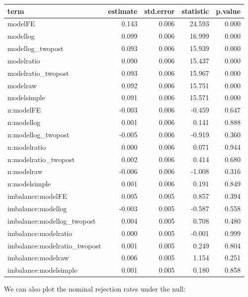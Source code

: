 \documentclass[
]{book}
\begin{document}
\begin{tabular}{l|r|r|r|r}
\hline
term & estimate & std.error & statistic & p.value\\
\hline
modelFE & 0.143 & 0.006 & 24.593 & 0.000\\
\hline
modellog & 0.099 & 0.006 & 16.999 & 0.000\\
\hline
modellog\_twopost & 0.093 & 0.006 & 15.939 & 0.000\\
\hline
modelratio & 0.090 & 0.006 & 15.437 & 0.000\\
\hline
modelratio\_twopost & 0.093 & 0.006 & 15.967 & 0.000\\
\hline
modelraw & 0.092 & 0.006 & 15.751 & 0.000\\
\hline
modelsimple & 0.091 & 0.006 & 15.571 & 0.000\\
\hline
n:modelFE & -0.003 & 0.006 & -0.459 & 0.647\\
\hline
n:modellog & 0.001 & 0.006 & 0.141 & 0.888\\
\hline
n:modellog\_twopost & -0.005 & 0.006 & -0.919 & 0.360\\
\hline
n:modelratio & 0.000 & 0.006 & 0.071 & 0.944\\
\hline
n:modelratio\_twopost & 0.002 & 0.006 & 0.414 & 0.680\\
\hline
n:modelraw & -0.006 & 0.006 & -1.008 & 0.316\\
\hline
n:modelsimple & 0.001 & 0.006 & 0.191 & 0.849\\
\hline
imbalance:modelFE & 0.005 & 0.005 & 0.857 & 0.394\\
\hline
imbalance:modellog & -0.003 & 0.005 & -0.587 & 0.558\\
\hline
imbalance:modellog\_twopost & 0.004 & 0.005 & 0.708 & 0.480\\
\hline
imbalance:modelratio & 0.000 & 0.005 & -0.001 & 0.999\\
\hline
imbalance:modelratio\_twopost & 0.001 & 0.005 & 0.249 & 0.804\\
\hline
imbalance:modelraw & 0.006 & 0.005 & 1.154 & 0.251\\
\hline
imbalance:modelsimple & 0.001 & 0.005 & 0.180 & 0.858\\
\hline
\end{tabular}

We can also plot the nominal rejection rates under the null:
\end{document}
